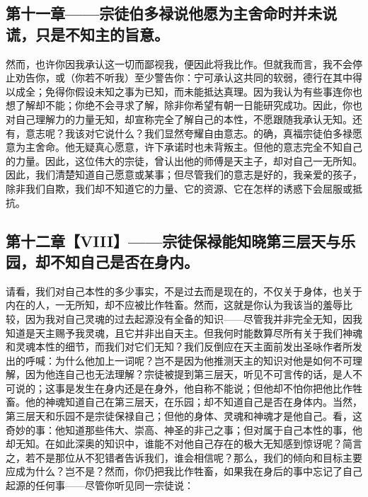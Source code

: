 
\subsection{第十一章——宗徒伯多禄说他愿为主舍命时并未说谎，只是不知主的旨意。}

然而，也许你因我承认这一切而鄙视我，便因此将我比作。但就我而言，我不会停止劝告你，或（你若不听我）至少警告你：宁可承认这共同的软弱，德行在其中得以成全；免得你假设未知之事为已知，而未能抵达真理。因为我认为有些事连你也想了解却不能；你绝不会寻求了解，除非你希望有朝一日能研究成功。因此，你也对自己理解力的力量无知，却宣称完全了解自己的本性，不愿跟随我承认无知。还有，意志呢？我该对它说什么？我们显然夸耀自由意志。的确，真福宗徒伯多禄愿意为主舍命。他无疑真心愿意，许下承诺时也未背叛主。但他的意志完全不知自己的力量。因此，这位伟大的宗徒，曾认出他的师傅是天主子，却对自己一无所知。因此，我们清楚知道自己愿意或某事；但尽管我们的意志是好的，我亲爱的孩子，除非我们自欺，我们却不知道它的力量、它的资源、它在怎样的诱惑下会屈服或抵抗。\par


\subsection{第十二章【VIII】——宗徒保禄能知晓第三层天与乐园，却不知自己是否在身内。}

请看，我们对自己本性的多少事实，不是过去而是现在的，不仅关于身体，也关于内在的人，一无所知，却不应被比作牲畜。然而，这就是你认为我该当的羞辱比较，因为我对自己灵魂的过去起源没有全备的知识——尽管我并非完全无知，因我知道是天主赐予我灵魂，且它并非出自天主。但我何时能数算尽所有关于我们神魂和灵魂本性的细节，而我们对它们无知？我们反倒应在天主面前发出圣咏作者所发出的呼喊：为什么他加上一词呢？岂不是因为他推测天主的知识对他是如何不可理解，因为他连自己也无法理解？宗徒被提到第三层天，听见不可言传的话，是人不可说的；这事是发生在身内还是在身外，他自称不能说；但他却不怕你把他比作牲畜。他的神魂知道自己在第三层天，在乐园；却不知道自己是否在身体内。当然，第三层天和乐园不是宗徒保禄自己；但他的身体、灵魂和神魂才是他自己。看，这奇妙的事：他知道那些伟大、崇高、神圣的非己之事；但对属于自己本性的事，他却无知。在如此深奥的知识中，谁能不对他自己存在的极大无知感到惊讶呢？简言之，若不是那位从不犯错者告诉我们，谁会相信呢？那么，我们的倾向和目标主要应成为什么？岂不是？然而，你仍把我比作牲畜，如果我在身后的事中忘记了自己起源的任何事——尽管你听见同一宗徒说：\par

